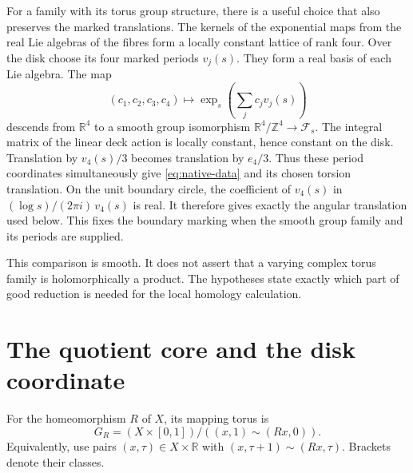 \documentclass[11pt]{article}
\numberwithin{equation}{section}
\begin{document}
For a family with its torus group structure, there is a useful choice
that also preserves the marked translations. The kernels of the
exponential maps from the real Lie algebras of the fibres form a locally
constant lattice of rank four. Over the disk choose its four marked
periods $v_j(s)$. They form a real basis of each Lie algebra. The map
\[
 (c_1,c_2,c_3,c_4)\longmapsto
       \exp_s\!\left(\sum_jc_jv_j(s)\right)
\]
descends from $\mathbb R^4$ to a smooth group isomorphism
$\mathbb R^4/\mathbb Z^4\to\mathcal F_s$.
The integral matrix of the linear deck action is locally constant,
hence constant on the disk. Translation by $v_4(s)/3$ becomes
translation by $e_4/3$. Thus these period coordinates simultaneously
give \eqref{eq:native-data} and its chosen torsion translation.
On the unit boundary circle, the coefficient of $v_4(s)$ in
$(\log s)/(2\pi i)\,v_4(s)$ is real. It therefore gives exactly
the angular translation used below. This fixes the boundary marking
when the smooth group family and its periods are supplied.

This comparison is smooth. It does not assert that a varying complex
torus family is holomorphically a product. The hypotheses state exactly
which part of good reduction is needed for the local homology calculation.

\section{The quotient core and the disk coordinate}

For the homeomorphism $R$ of $X$, its mapping torus is
\[
 G_R=(X\times[0,1])/((x,1)\sim(Rx,0)).
\]
Equivalently, use pairs $(x,\tau)\in X\times\mathbb R$ with
$(x,\tau+1)\sim(Rx,\tau)$. Brackets denote their classes.
\end{document}
